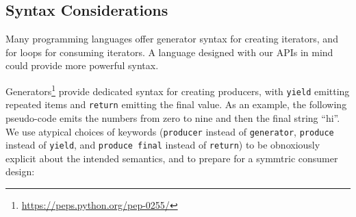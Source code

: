 \documentclass[sigplan,screen,10pt,anonymous,review]{acmart}
\begin{document}





\subsection{Syntax Considerations}\label{syntax}

Many programming languages offer generator syntax for creating iterators, and for loops for consuming iterators. A language designed with our APIs in mind could provide more powerful syntax.

Generators\footnote{\url{https://peps.python.org/pep-0255/}} provide dedicated syntax for creating producers, with \texttt{yield} emitting repeated items and \texttt{return} emitting the final value. As an example, the following pseudo-code emits the numbers from zero to nine and then the final string ``hi''. We use atypical choices of keywords (\texttt{producer} instead of \texttt{generator}, \texttt{produce} instead of \texttt{yield}, and \texttt{produce final} instead of \texttt{return}) to be obnoxiously explicit about the intended semantics, and to prepare for a symmtric consumer design:
\end{document}
